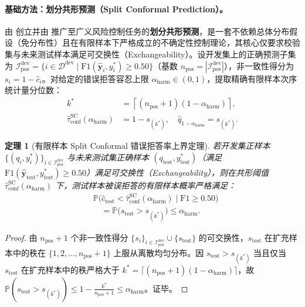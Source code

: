 \documentclass[11pt]{article}
\newtheorem{theorem}{定理}
\begin{document}
\paragraph{基础方法：划分共形预测（Split Conformal Prediction）。}
由 \citet{vovk2005algorithmic} 创立并由 \citet{angelopoulos2024conformal} 推广至广义风险控制任务的\textbf{划分共形预测}，是一套不依赖总体分布假设（免分布性）且在有限样本下严格成立的不确定性控制理论，其核心仅要求校验集与未来测试样本满足可交换性（Exchangeability）。设开发集上的正确预测子集为 $\mathcal{I}_{\text{pos}}^{\text{dev}} = \{i \in \mathcal{D}^{\text{dev}} \mid \text{F1}(\hat{\mathbf{y}}_i, y_i^*) \ge 0.50\}$（基数 $n_{\text{pos}} = |\mathcal{I}_{\text{pos}}^{\text{dev}}|$），非一致性得分为 $s_i = 1 - \hat{c}_i$。对给定的错误拒答容忍上限 $\alpha_{\text{harm}} \in (0, 1)$，提取精确有限样本次序统计量分位数：
\begin{align}
k^* &= \left\lceil (n_{\text{pos}} + 1)(1 - \alpha_{\text{harm}}) \right\rceil, \label{eq:zh_conformal} \\
\hat{\tau}_{\text{conf}}^{\text{SC}}(\alpha_{\text{harm}}) &= 1 - s_{(k^*)}, \quad \hat{q}_{1-\alpha_{\text{harm}}} = s_{(k^*)}. \nonumber
\end{align}

\begin{theorem}[有限样本 Split Conformal 错误拒答率上界定理]
\label{thm:zh_conformal}
若开发集正样本 $\{(q_i, y_i^*)\}_{i \in \mathcal{I}_{\text{pos}}^{\text{dev}}}$ 与未来测试集正确样本 $(q_{\text{test}}, y_{\text{test}}^*)$（满足 $\text{F1}(\hat{\mathbf{y}}_{\text{test}}, y_{\text{test}}^*) \ge 0.50$）满足可交换性（Exchangeability），则在共形阈值 $\hat{\tau}_{\text{conf}}^{\text{SC}}(\alpha_{\text{harm}})$ 下，测试样本被误拒答的有限样本概率严格满足：
\begin{align}
&\mathbb{P}\bigl( \hat{c}_{\text{test}} < \hat{\tau}_{\text{conf}}^{\text{SC}}(\alpha_{\text{harm}}) \;\big|\; \text{F1} \ge 0.50 \bigr) \nonumber \\
&\quad = \mathbb{P}\bigl( s_{\text{test}} > s_{(k^*)} \bigr) \le \alpha_{\text{harm}}.
\label{eq:zh_thm_bound}
\end{align}
\end{theorem}
\begin{proof}
由 $n_{\text{pos}} + 1$ 个非一致性得分 $\{s_i\}_{i \in \mathcal{I}_{\text{pos}}^{\text{dev}}} \cup \{s_{\text{test}}\}$ 的可交换性，$s_{\text{test}}$ 在扩充样本中的秩在 $\{1, 2, \dots, n_{\text{pos}} + 1\}$ 上服从离散均匀分布。因 $s_{\text{test}} > s_{(k^*)}$ 当且仅当 $s_{\text{test}}$ 在扩充样本中的秩严格大于 $k^* = \lceil (n_{\text{pos}} + 1)(1 - \alpha_{\text{harm}}) \rceil$，故 $\mathbb{P}(s_{\text{test}} > s_{(k^*)}) \le 1 - \frac{k^*}{n_{\text{pos}} + 1} \le \alpha_{\text{harm}}$。证毕。
\end{proof}
\end{document}

